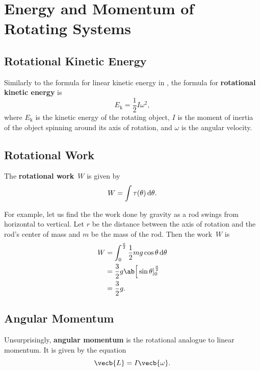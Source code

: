 \chapter{Energy and Momentum of Rotating Systems}


\section{Rotational Kinetic Energy}

Similarly to the formula for linear kinetic energy in
,
the formula for \textbf{rotational kinetic energy} is
\begin{equation}
    E_\mathrm{k} = \frac{1}{2} I \omega^2,
\end{equation}
where \(E_\mathrm{k}\) is the kinetic energy of the rotating object,
\(I\) is the moment of inertia of the object spinning around its axis
of rotation,
and \(\omega\) is the angular velocity.

\section{Rotational Work}

The \textbf{rotational work}~\(W\) is given by
\begin{equation}
    W = \int \tau(\theta) \odif{\theta}.
\end{equation}

For example, let us find the the work done by gravity
as a rod swings from horizontal to vertical.
Let \(r\) be the distance between the axis of rotation and the rod's
center of mass
and \(m\) be the mass of the rod.
Then the work~\(W\) is
\begin{equation}
    \begin{aligned}
        W &= \int_{0}^\frac{\pi}{2} \frac{1}{2} m g \cos\theta \odif{\theta} \\
        &= \frac{3}{2} g \ab\Big[\sin\theta]_0^\frac{\pi}{2} \\
        &= \frac{3}{2} g.
    \end{aligned}
\end{equation}

\section{Angular Momentum}

Unsurprisingly, \textbf{angular momentum} is the rotational analogue
to linear momentum.
It is given by the equation
\begin{equation}
    \vecb{L} = I \vecb{\omega}.
\end{equation}


